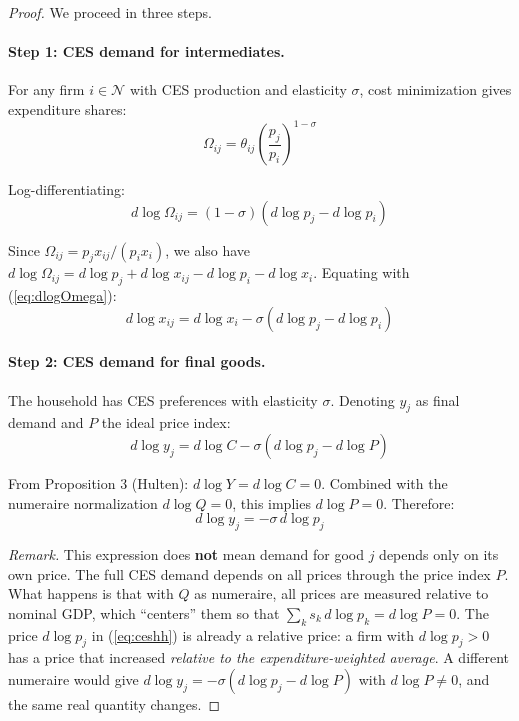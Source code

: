 \documentclass[11pt]{article}
\newcommand{\N}{\mathcal{N}}
\begin{document}
\begin{proof}
We proceed in three steps.

\paragraph{Step 1: CES demand for intermediates.}
For any firm $i \in \N$ with CES production and elasticity $\sigma$, cost minimization gives expenditure shares:
$$\Omega_{ij} = \theta_{ij}\left(\frac{p_j}{p_i}\right)^{1-\sigma}$$

Log-differentiating:
\begin{equation}
    \label{eq:dlogOmega}
    d\log \Omega_{ij} = (1-\sigma)(d\log p_j - d\log p_i)
\end{equation}

Since $\Omega_{ij} = p_j x_{ij}/(p_i x_i)$, we also have $d\log \Omega_{ij} = d\log p_j + d\log x_{ij} - d\log p_i - d\log x_i$. Equating with (\ref{eq:dlogOmega}):
\begin{equation}
    \label{eq:cesdemand}
    d\log x_{ij} = d\log x_i - \sigma(d\log p_j - d\log p_i)
\end{equation}

\paragraph{Step 2: CES demand for final goods.}
The household has CES preferences with elasticity $\sigma$. Denoting $y_j$ as final demand and $P$ the ideal price index:
$$d\log y_j = d\log C - \sigma(d\log p_j - d\log P)$$

From Proposition 3 (Hulten): $d\log Y = d\log C = 0$. Combined with the numeraire normalization $d\log Q = 0$, this implies $d\log P = 0$. Therefore:
\begin{equation}
    \label{eq:ceshh}
    d\log y_j = -\sigma\, d\log p_j
\end{equation}

\noindent\textit{Remark.} This expression does \textbf{not} mean demand for good $j$ depends only on its own price. The full CES demand depends on all prices through the price index $P$. What happens is that with $Q$ as numeraire, all prices are measured relative to nominal GDP, which ``centers'' them so that $\sum_k s_k\, d\log p_k = d\log P = 0$. The price $d\log p_j$ in (\ref{eq:ceshh}) is already a relative price: a firm with $d\log p_j > 0$ has a price that increased \textit{relative to the expenditure-weighted average}. A different numeraire would give $d\log y_j = -\sigma(d\log p_j - d\log P)$ with $d\log P \neq 0$, and the same real quantity changes.


\end{proof}
\end{document}
